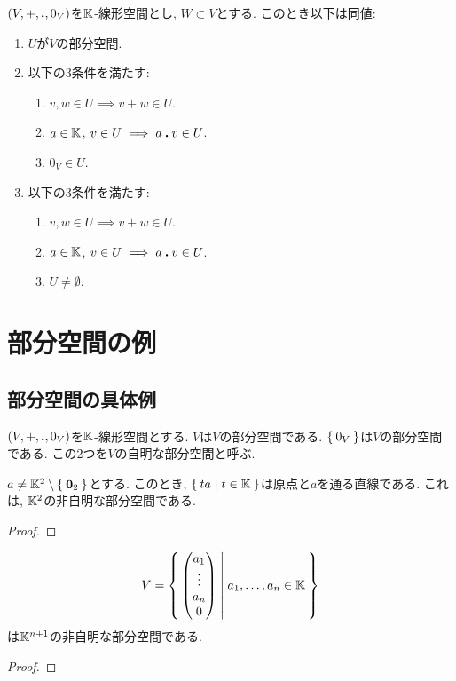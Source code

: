 \begin{lemma}
  $(V,+,\mathbin{\boldsymbol{.}},0_V)$を$\mathbb{K}$-線形空間とし, $W\subset V$とする.
  このとき以下は同値:
  \begin{enumerate}
  \item $U$が$V$の部分空間.
  \item 以下の$3$条件を満たす:
    \begin{enumerate}
  \item $v,w\in U \implies v+w\in U$.
  \item $a\in\mathbb{K}$, $v\in U \implies a\mathbin{\boldsymbol{.}} v\in U$.
  \item $0_V\in U$.
    \end{enumerate}
  \item 以下の$3$条件を満たす:
    \begin{enumerate}
  \item $v,w\in U \implies v+w\in U$.
  \item $a\in\mathbb{K}$, $v\in U \implies a\mathbin{\boldsymbol{.}} v\in U$.
  \item $U\neq \emptyset$.
    \end{enumerate}
  \end{enumerate}
\end{lemma}

\section{部分空間の例}
\subsection{部分空間の具体例}
\begin{example}
  $(V,+,\mathbin{\boldsymbol{.}},0_V)$を$\mathbb{K}$-線形空間とする.
  $V$は$V$の部分空間である.
  $\Set{0_V}$は$V$の部分空間である.
  この2つを$V$の自明な部分空間と呼ぶ.
\end{example}

\begin{example}
  $a\neq \mathbb{K}^2\setminus\Set{\boldsymbol{0}_2}$とする.
  このとき, $\Set{ta|t\in \mathbb{K}}$は原点と$a$を通る直線である.
  これは, $\mathbb{K}^2$の非自明な部分空間である.
\end{example}
\begin{proof}\end{proof}


\begin{example}
  \begin{align*}
    V=\Set{\begin{pmatrix}a_1\\\vdots\\a_n\\0\end{pmatrix}|a_1,\ldots,a_n\in\mathbb{K}}
  \end{align*}
  は$\mathbb{K}^{n+1}$の非自明な部分空間である.
\end{example}
\begin{proof}\end{proof}

